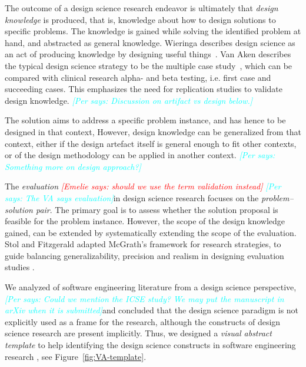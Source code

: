 \documentclass[graybox]{svmult}
\newcommand{\emelie}[1]{\textcolor{red}{{\it [Emelie says: #1]}}}
\newcommand{\per}[1]{\textcolor{cyan}{{\it [Per says: #1]}}}
\newcommand{\emelie}[1]{}
\newcommand{\per}[1]{}
\begin{document}
The outcome of a design science research endeavor is ultimately that \emph{design knowledge} is produced, that is, knowledge about how to design solutions to specific problems. The knowledge is gained while solving the identified problem at hand, and abstracted as general knowledge. Wieringa describes design science as an act of producing knowledge by designing useful things~\cite{wieringa_design_2009}.  Van Aken describes the typical design science strategy to be the multiple case study~\cite{van_aken_management_2004}, which can be compared with clinical research alpha- and beta testing, i.e. first case and succeeding cases. This emphasizes the need for replication studies to validate design knowledge. \per{Discussion on artifact vs design below.}

The solution aims to address a specific problem instance, and has hence to be designed in that context, However, design knowledge can be generalized from that context, either if the design artefact itself is general enough to fit other contexts, or of the design methodology can be applied in another context.
\per{Something more on design approach?}

The \emph{evaluation} \emelie{should we use the term validation instead} \per{The VA says evaluation}in design science research focuses on the \emph{problem--solution pair}. The primary goal is to assess whether the solution proposal is feasible for the problem instance. However, the scope of the design knowledge gained, can be extended by systematically extending the scope of the evaluation.  Stol and Fitzgerald adapted McGrath's framework for research strategies, to guide balancing generalizability, precision and realism in designing evaluation studies \cite{StolABC18}.


We analyzed of software engineering literature from a design science perspective, \per{Could we mention the ICSE study? We may put the manuscript in arXiv when it is submitted}and concluded that the design science paradigm is not explicitly used as a frame for the research, although the constructs of design science research are present implicitly. Thus, we designed a \emph{visual abstract template} to help identifying the design science constructs in software engineering research \cite{StoreyESEM17}, see Figure~\ref{fig:VA-template}. 
\end{document}
